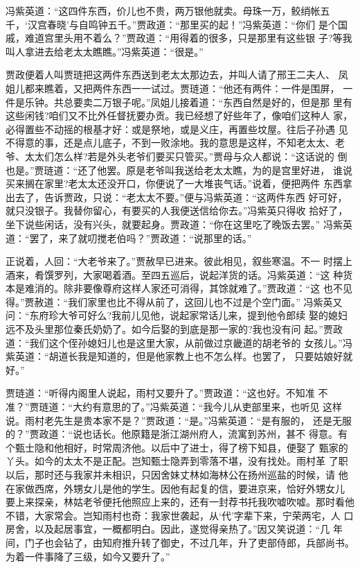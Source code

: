 冯紫英道：“这四件东西，价儿也不贵，两万银他就卖。母珠一万，鲛绡帐五
千，‘汉宫春晓’与自鸣钟五千。”贾政道：“那里买的起！”冯紫英道：“你们
是个国戚，难道宫里头用不着么？”贾政道：“用得着的很多，只是那里有这些银
子?等我叫人拿进去给老太太瞧瞧。”冯紫英道：“很是。”

贾政便着人叫贾琏把这两件东西送到老太太那边去，并叫人请了邢王二夫人、
凤姐儿都来瞧着，又把两件东西一一试过。贾琏道：“他还有两件：一件是围屏，
一件是乐钟。共总要卖二万银子呢。”凤姐儿接着道：“东西自然是好的，但是那
里有这些闲钱?咱们又不比外任督抚要办贡。我已经想了好些年了，像咱们这种人
家，必得置些不动摇的根基才好：或是祭地，或是义庄，再置些坟屋。往后子孙遇
见不得意的事，还是点儿底子，不到一败涂地。我的意思是这样，不知老太太、老
爷、太太们怎么样?若是外头老爷们要买只管买。”贾母与众人都说：“这话说的
倒也是。”贾琏道：“还了他罢。原是老爷叫我送给老太太瞧，为的是宫里好进，
谁说买来搁在家里?老太太还没开口，你便说了一大堆丧气话。”说着，便把两件
东西拿出去了，告诉贾政，只说：“老太太不要。”便与冯紫英道：“这两件东西
好可好，就只没银子。我替你留心，有要买的人我便送信给你去。”冯紫英只得收
拾好了，坐下说些闲话，没有兴头，就要起身。贾政道：“你在这里吃了晚饭去罢。”
冯紫英道：“罢了，来了就叨搅老伯吗？”贾政道：“说那里的话。”

正说着，人回：“大老爷来了。”贾赦早已进来。彼此相见，叙些寒温。不一
时摆上酒来，肴馔罗列，大家喝着酒。至四五巡后，说起洋货的话。冯紫英道：“这
种货本是难消的。除非要像尊府这样人家还可消得，其馀就难了。”贾政道：“这
也不见得。”贾赦道：“我们家里也比不得从前了，这回儿也不过是个空门面。”
冯紫英又问：“东府珍大爷可好么?我前儿见他，说起家常话儿来，提到他令郎续
娶的媳妇远不及头里那位秦氏奶奶了。如今后娶的到底是那一家的?我也没有问
起。”贾政道：“我们这个侄孙媳妇儿也是这里大家，从前做过京畿道的胡老爷的
女孩儿。”冯紫英道：“胡道长我是知道的，但是他家教上也不怎么样。也罢了，
只要姑娘好就好。”

贾琏道：“听得内阁里人说起，雨村又要升了。”贾政道：“这也好。不知准
不准？”贾琏道：“大约有意思的了。”冯紫英道：“我今儿从吏部里来，也听见
这样说。雨村老先生是贵本家不是？”贾政道：“是。”冯紫英道：“是有服的，
还是无服的？”贾政道：“说也话长。他原籍是浙江湖州府人，流寓到苏州，甚不
得意。有个甄士隐和他相好，时常周济他。以后中了进士，得了榜下知县，便娶了
甄家的丫头。如今的太太不是正配。岂知甄士隐弄到零落不堪，没有找处。雨村革
了职以后，那时还与我家并未相识，只因舍妹丈林如海林公在扬州巡盐的时候，请
他在家做西席，外甥女儿是他的学生。因他有起复的信，要进京来，恰好外甥女儿
要上来探亲，林姑老爷便托他照应上来的，还有一封荐书托我吹嘘吹嘘。那时看他
不错，大家常会。岂知雨村也奇：我家世袭起，从‘代’字辈下来，宁荣两宅，人
口房舍，以及起居事宜，一概都明白。因此，遂觉得亲热了。”因又笑说道：“几
年间，门子也会钻了，由知府推升转了御史，不过几年，升了吏部侍郎，兵部尚书。
为着一件事降了三级，如今又要升了。”

